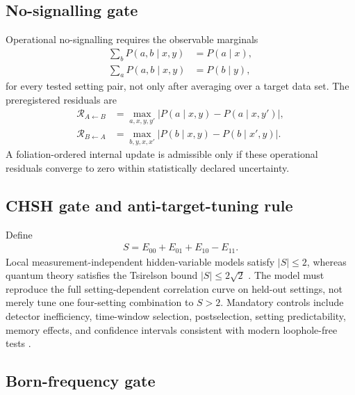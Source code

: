 \documentclass[11pt]{article}
\begin{document}
\subsection*{No-signalling gate}

Operational no-signalling requires the observable marginals
\begin{align}
    \sum_bP(a,b\mid x,y)&=P(a\mid x),
    \\
    \sum_aP(a,b\mid x,y)&=P(b\mid y),
    \label{eq:spec_no_signalling_marginals}
\end{align}
for every tested setting pair, not only after averaging over a target data set.
The preregistered residuals are
\begin{align}
    \mathcal R_{A\leftarrow B}
    &=
    \max_{a,x,y,y'}
    \left|
        P(a\mid x,y)-P(a\mid x,y')
    \right|,
    \\
    \mathcal R_{B\leftarrow A}
    &=
    \max_{b,y,x,x'}
    \left|
        P(b\mid x,y)-P(b\mid x',y)
    \right|.
    \label{eq:spec_no_signalling_residuals}
\end{align}
A foliation-ordered internal update is admissible only if these operational
residuals converge to zero within statistically declared uncertainty.

\subsection*{CHSH gate and anti-target-tuning rule}

Define
\begin{align}
    S
    =
    E_{00}+E_{01}+E_{10}-E_{11}.
    \label{eq:spec_chsh_parameter}
\end{align}
Local measurement-independent hidden-variable models satisfy \(|S|\le2\),
whereas quantum theory satisfies the Tsirelson bound \(|S|\le2\sqrt2\)
\cite{Bell1964,CHSH1969,Tsirelson1980}.  The model must reproduce the full
setting-dependent correlation curve on held-out settings, not merely tune one
four-setting combination to \(S>2\).  Mandatory controls include detector
inefficiency, time-window selection, postselection, setting predictability,
memory effects, and confidence intervals consistent with modern loophole-free
tests \cite{Hensen2015,Giustina2015,Shalm2015}.

\subsection*{Born-frequency gate}
\end{document}
